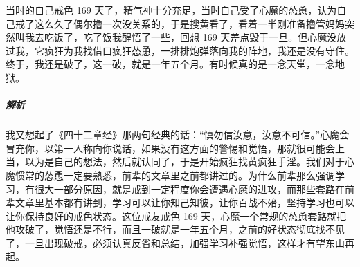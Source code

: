 \begin{case}[不要听信心魔的怂恿]
    当时的自己戒色 169 天了，精气神十分充足，当时自己受了心魔的怂恿，认为自己戒了这么久了偶尔撸一次没关系的，于是搜黄看了，看着一半刚准备撸管妈妈突然叫我去吃饭了，吃了饭我醒悟了一些，回想 169 天差点毁于一旦。但心魔没放过我，它疯狂为我找借口疯狂怂恿，一排排炮弹落向我的阵地，我还是没有守住。终于，我还是破了，这一破，就是一年五个月。有时候真的是一念天堂，一念地狱。
    \subparagraph{解析} 我又想起了《四十二章经》那两句经典的话：“慎勿信汝意，汝意不可信。”心魔会冒充你，以第一人称向你说话，如果没有这方面的警惕和觉悟，那就很可能会上当，以为是自己的想法，然后就认同了，于是开始疯狂找黄疯狂手淫。我们对于心魔惯常的怂恿一定要熟悉，前辈的文章里之前都讲过的。为什么前辈那么强调学习，有很大一部分原因，就是戒到一定程度你会遭遇心魔的进攻，而那些套路在前辈文章里基本都有讲到，学习可以让你知己知彼，让你百战不殆，坚持学习也可以让你保持良好的戒色状态。这位戒友戒色 169 天，心魔一个常规的怂恿套路就把他攻破了，觉悟还是不行，而且一破就是一年五个月，之前的好状态彻底找不见了，一旦出现破戒，必须认真反省和总结，加强学习补强觉悟，这样才有望东山再起。
\end{case}

